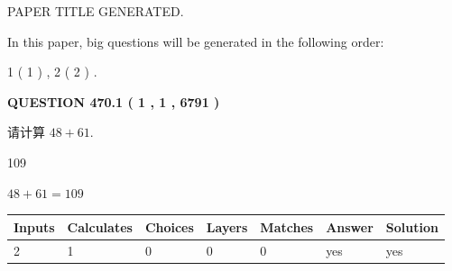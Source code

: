 \documentclass{ctexart}
\begin{document}
   
 \vspace{0.2in}
 
 
 
 
   
   
 PAPER TITLE GENERATED.
   
   
   
\vspace{0.2in}
   
In this paper, big questions will be generated in the following order: 
   
   
   1 ( 1 )
 ,
   2 ( 2 )
 .
  
\vspace{0.2in}
  
{\textbf{\Large{QUESTION
470.1 
 ( 1 , 1 , 6791 )
}}}
  
  
 
请计算 $ %
48 +  %
61 $.
 
 
 
\noindent{}
 
 

109
 
 
\noindent{}
 
 

 
 
 
\noindent{}
 
 

$ %
48 +  %
61=   %
109$
 
 
\noindent{}
 
 

 
   
   
   
   
\noindent\begin{tabular}{|l|l|l|l|l|l|l|}
 \hline
Inputs & Calculates & Choices & Layers & Matches & Answer & Solution \\ \hline
 2  & 
 1  & 
 0
  & 
 0  & 
 0  & 
  yes & 
  yes 
  \\ \hline
 \end{tabular}
   
   
   
   
\noindent{}
   
   
  
\end{document}
